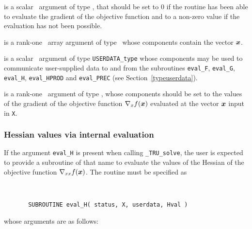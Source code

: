 \documentclass{galahad}
\newcommand{\packagename}{TRU}
\newcommand{\fullpackagename}{\libraryname\_\packagename}
\newcommand{\solver}{{\tt \fullpackagename\_solve}}
\begin{document}
\begin{description}
 is a scalar \intentout\ argument of type \integer,
that should be set to 0 if the routine has been able to evaluate
the gradient of the objective function
and to a non-zero value if the evaluation has not been possible.

 is a rank-one \intentin\ array argument of type \realdp\
whose components contain the vector ${\bm{x}}$.

 is a scalar \intentinout\ argument of type
{\tt USERDATA\_type} whose components may be used
to communicate user-supplied data to and from the
subroutines {\tt eval\_F}, {\tt eval\_G},
{\tt eval\_H}, {\tt eval\_HPROD} and {\tt eval\_PREC}
(see Section~\ref{typeuserdata}).

 is a rank-one \intentout\ argument of type \realdp,
whose components should be set to the values of the gradient
of the objective function $\nabla_x f({\bm{x}})$
evaluated at the vector ${\bm{x}}$ input in {\tt X}.

\end{description}


\subsubsection{Hessian values via internal evaluation\label{hfv}}

If the argument {\tt eval\_H} is present when calling \solver, the
user is expected to provide a subroutine of that name to evaluate the
values of the Hessian of the objective function $\nabla_{xx} f({\bm{x}})$.
The routine must be specified as

\def\baselinestretch{0.8}
{\tt
\begin{verbatim}
       SUBROUTINE eval_H( status, X, userdata, Hval )
\end{verbatim} }
\def\baselinestretch{1.0}
\noindent whose arguments are as follows:
\end{document}
